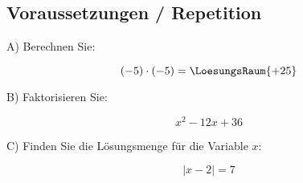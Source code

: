 

\subsection{Voraussetzungen / Repetition}
A) Berechnen Sie:

$$(-5)\cdot{}(-5) = \LoesungsRaum{+25}$$

B) Faktorisieren Sie:

$$x^2-12x+36$$



C) Finden Sie die Lösungsmenge für die Variable $x$:

$$|x-2| = 7$$



\newpage
